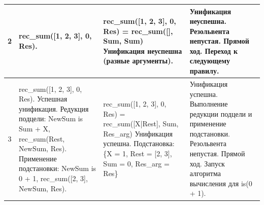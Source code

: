 \begin{tabularx}{\textwidth}{|c|>{\small}X|>{\small}X|>{\small}X|}
	2                                                                                  &
	rec\_sum([1, 2, 3], 0, Res).                                                       &
	rec\_sum([1, 2, 3], 0, Res) = rec\_sum([], Sum, Sum) \newline
	Унификация неуспешна (разные аргументы).                                           &
	Унификация неуспешна. \newline
	Резольвента непустая. \newline
	Прямой ход. Переход к следующему правилу.                                            \\
	\hline

	3                                                                                  &
	rec\_sum([1, 2, 3], 0, Res). \newline
	Успешная унификация. \newline
	Редукция подцели: \newline
	NewSum is Sum + X, \newline
	rec\_sum(Rest, NewSum, Res). \newline
	Применение подстановки: \newline
	NewSum is 0 + 1, \newline
	rec\_sum([2, 3], NewSum, Res).                                                     &
	rec\_sum([1, 2, 3], 0, Res) = \newline
	rec\_sum([X|Rest], Sum, Res\_arg) \newline
	Унификация успешна. \newline
	Подстановка: \newline
	\{X = 1, Rest = [2, 3], Sum = 0, Res\_arg = Res\}                                  &
	Унификация успешна. \newline
	Выполнение редукции подцели и применение подстановки. \newline
	Резольвента непустая. \newline
	Прямой ход. \newline
	Запуск алгоритма вычисления для is(0 + 1).                                           \\
	\hline


\end{tabularx}
